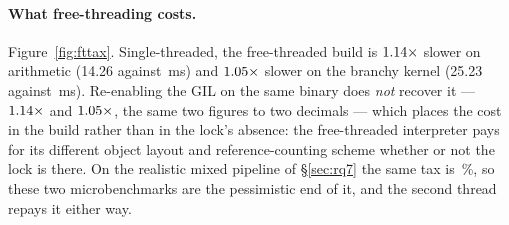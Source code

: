 \paragraph{What free-threading costs.} Figure~\ref{fig:fttax}. Single-threaded, the
free-threaded build is $\meas{ratio:b4_threads-ft:single_thread_arith/ft|b4_threads-gil:single_thread_arith/gil}{1.14}\times$ slower on arithmetic (14.26 against \,ms) and
$\meas{ratio:b4_threads-ft:single_thread_branchy/ft|b4_threads-gil:single_thread_branchy/gil}{1.05}\times$ slower on the branchy kernel (25.23 against \,ms). Re-enabling the GIL on the
same binary does \emph{not} recover it --- $\meas{ratio:b4_threads-ft_gil:single_thread_arith/ft_gil|b4_threads-gil:single_thread_arith/gil}{1.14}\times$ and $\meas{ratio:b4_threads-ft_gil:single_thread_branchy/ft_gil|b4_threads-gil:single_thread_branchy/gil}{1.05}\times$, the same two figures to
two decimals --- which places the cost in the build rather than in the lock's absence: the
free-threaded interpreter pays for its different object layout and reference-counting scheme
whether or not the lock is there. On the realistic mixed pipeline of \S\ref{sec:rq7} the same
tax is \,\%, so these two microbenchmarks are the pessimistic end of it, and the second
thread repays it either way.

